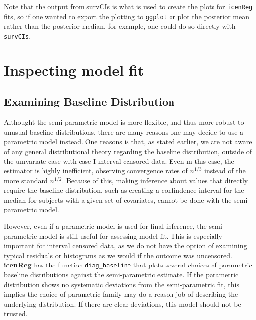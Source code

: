 \documentclass[a4paper]{article}
\begin{document}
Note that the output from survCIs is what is used to create the 
plots for \texttt{icenReg} fits, so if one wanted to export the plotting to 
\texttt{ggplot} or plot the posterior mean rather than the posterior median, for example, one could do so directly with \texttt{survCIs}. 

\section{Inspecting model fit}

\subsection{Examining Baseline Distribution}
  
Althought the semi-parametric model is more flexible, and thus more robust to unusual baseline distributions, there are many reasons one may decide to use a parametric model instead. One reasons is that, as stated earlier, we are not aware of any general distributional theory regarding the baseline distribution, outside of the univariate case with case I interval censored data. Even in this case, the estimator is highly inefficient, observing convergence rates of $n^{1/3}$ instead of the more standard $n^{1/2}$. Because of this, making inference about values that directly require the baseline distribution, such as creating a confindence interval for the median for subjects with a given set of covariates, cannot be done with the semi-parametric model. 
  
  
However, even if a parametric model is used for final inference, the semi-parametric model is still useful for assessing model fit. This is especially important for interval censored data, as we do not have the option of examining typical residuals or histograms as we would if the outcome was uncensored. {\bf icenReg} has the function \texttt{diag\_baseline} that plots several choices of parametric baseline distributions against the semi-parametric estimate. If the parametric distribution shows no systematic deviations from the semi-parametric fit, this implies the choice of parametric family may do a reason job of describing the underlying distribution. If there are clear deviations, this model should not be trusted. 
  
\end{document}
